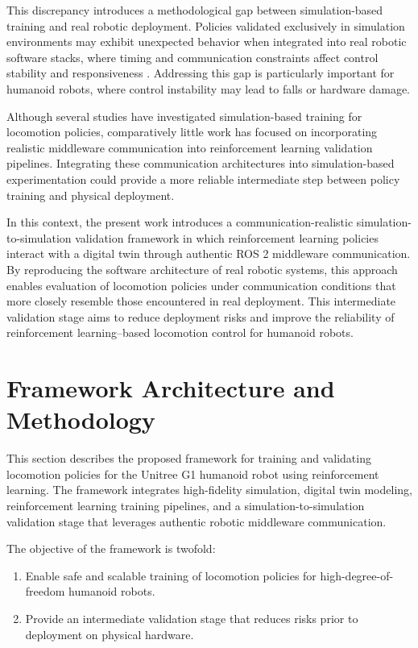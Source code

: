 \documentclass[pdflatex,sn-mathphys-num]{sn-jnl}%
\theoremstyle{thmstyleone}%
\theoremstyle{thmstyletwo}%
\theoremstyle{thmstylethree}%
\begin{document}
This discrepancy introduces a methodological gap between simulation-based training and real robotic deployment. Policies validated exclusively in simulation environments may exhibit unexpected behavior when integrated into real robotic software stacks, where timing and communication constraints affect control stability and responsiveness \cite{bib18}. Addressing this gap is particularly important for humanoid robots, where control instability may lead to falls or hardware damage.

Although several studies have investigated simulation-based training for locomotion policies, comparatively little work has focused on incorporating realistic middleware communication into reinforcement learning validation pipelines. Integrating these communication architectures into simulation-based experimentation could provide a more reliable intermediate step between policy training and physical deployment.

In this context, the present work introduces a communication-realistic simulation-to-simulation validation framework in which reinforcement learning policies interact with a digital twin through authentic ROS 2 middleware communication. By reproducing the software architecture of real robotic systems, this approach enables evaluation of locomotion policies under communication conditions that more closely resemble those encountered in real deployment. This intermediate validation stage aims to reduce deployment risks and improve the reliability of reinforcement learning–based locomotion control for humanoid robots.

\section{Framework Architecture and Methodology}
\label{framework}
This section describes the proposed framework for training and validating locomotion policies for the Unitree G1 humanoid robot using reinforcement learning. The framework integrates high-fidelity simulation, digital twin modeling, reinforcement learning training pipelines, and a simulation-to-simulation validation stage that leverages authentic robotic middleware communication.

The objective of the framework is twofold:
\begin{enumerate}
    \item Enable safe and scalable training of locomotion policies for high-degree-of-freedom humanoid robots.
    \item Provide an intermediate validation stage that reduces risks prior to deployment on physical hardware.
\end{enumerate}
\end{document}
